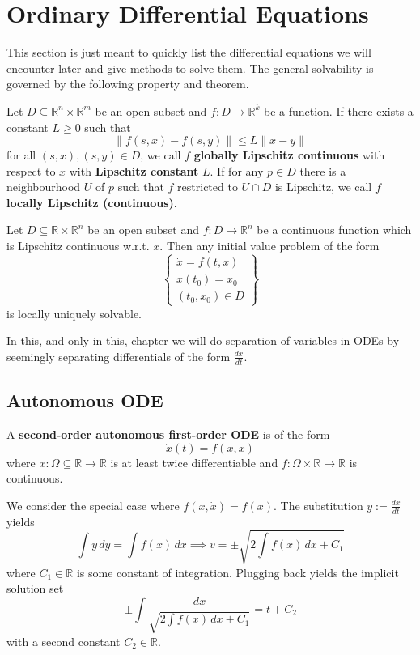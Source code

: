 \section{Ordinary Differential Equations}
This section is just meant to quickly list the differential equations we will encounter later and give methods to solve them.
The general solvability is governed by the following property and theorem.
\begin{definition}
    Let $D \subseteq \mathbb{R}^n \times \mathbb{R}^m$ be an open subset and $f: D \to \mathbb{R}^k$ be a function. If there exists a constant $L \geq 0$ such that \[
    \|f(s,x)-f(s,y)\| \leq L\|x-y\|
    \] for all $(s,x),(s,y) \in D$, we call $f$ \textbf{globally Lipschitz continuous} with respect to $x$ with \textbf{Lipschitz constant} $L$.
    If for any $p \in D$ there is a neighbourhood $U$ of $p$ such that $f$ restricted to $U \cap D$ is Lipschitz, we call $f$ \textbf{locally Lipschitz (continuous)}.
\end{definition}
\begin{theorem}
   Let $D \subseteq \mathbb{R} \times \mathbb{R}^n$ be an open subset and $f: D \to \mathbb{R}^n$ be a continuous function which is Lipschitz continuous w.r.t. $x$. Then any initial value problem of the form
   \begin{equation*}
       \left.\begin{cases}
           \dot{x}=f(t,x)\\
           x(t_0)=x_0\\
           (t_0,x_0) \in D
       \end{cases}\right\}
   \end{equation*}
   is locally uniquely solvable.
\end{theorem}
In this, and only in this, chapter we will do separation of variables in ODEs by seemingly separating differentials of the form $\frac{dx}{dt}$.
\subsection*{Autonomous ODE}
\begin{definition}
    A \textbf{second-order autonomous first-order ODE} is of the form
    \begin{equation}
        \ddot{x}(t)=f(x, \dot{x})
    \end{equation}
    where $x: \Omega \subseteq \mathbb{R} \to \mathbb{R}$ is at least twice differentiable and $f: \Omega \times \mathbb{R} \to \mathbb{R}$ is continuous.
\end{definition}
We consider the special case where $f(x,\dot{x})=f(x)$. The substitution $y:=\frac{dx}{dt}$ yields
\[
    \int y \, dy = \int f(x) \, dx \implies v= \pm \sqrt{2 \int f(x) \, dx + C_1}
\] where $C_1 \in \mathbb{R}$ is some constant of integration. Plugging back yields the implicit solution set
\begin{equation}
    \pm \int \frac{dx}{\sqrt{2 \int f(x)\, dx + C_1}} = t +C_2
\end{equation}
with a second constant $C_2 \in \mathbb{R}$. 
